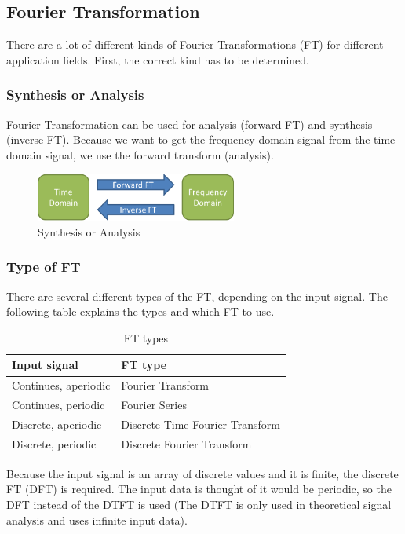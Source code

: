 \documentclass[notitlepage]{scrreprt}
\begin{document}
\subsection{Fourier Transformation}
There are a lot of different kinds of Fourier Transformations (FT) for different application fields. First, the correct kind has to be determined.

\subsubsection{Synthesis or Analysis}
Fourier Transformation can be used for analysis (forward FT) and synthesis (inverse FT). Because we want to get the frequency domain signal from the time domain signal, we use the forward transform (analysis).

\begin{figure}[H]
	\centering
	\includegraphics[width=250px]{images/DFT_types1.png}
	\caption{Synthesis or Analysis}
	\label{fig:dft-types1}
\end{figure}

\subsubsection{Type of FT}
There are several different types of the FT, depending on the input signal. The following table explains the types and which FT to use.

\begin{table}
\centering
\begin{tabular}{|l|l|}
	\hline
	\textbf{Input signal} & \textbf{FT type} \\ \hline
	Continues, aperiodic & Fourier Transform \\ \hline
	Continues, periodic & Fourier Series \\ \hline
	Discrete, aperiodic & Discrete Time Fourier Transform \\ \hline
	Discrete, periodic & Discrete Fourier Transform \\ \hline
\end{tabular}
\caption{FT types}
\end{table}

Because the input signal is an array of discrete values and it is finite, the discrete FT (DFT) is required. The input data is thought of it would be periodic, so the DFT instead of the DTFT is used (The DTFT is only used in theoretical signal analysis and uses infinite input data).
\end{document}
